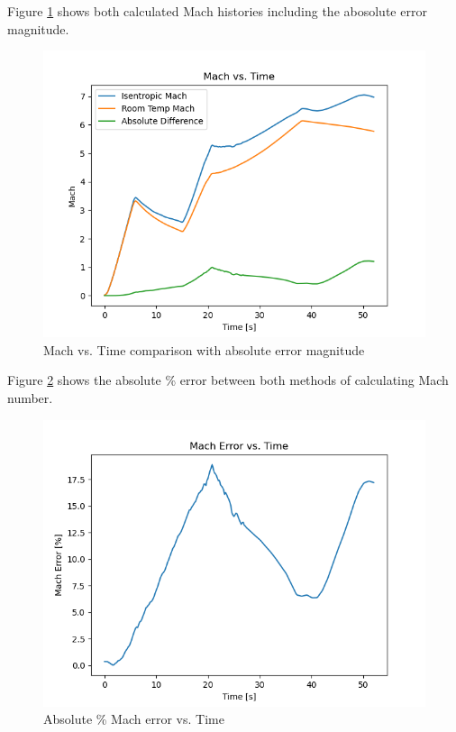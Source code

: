 \documentclass[../main.tex]{subfiles}
\begin{document}
Figure \ref{Mach} shows both calculated Mach histories including the abosolute error magnitude.

\begin{figure}[h]
    \centering
    \includegraphics[scale=.7]{../../images/problem_1/Mach_vs_Time.png}
    \caption{Mach vs. Time comparison with absolute error magnitude}
    \label{Mach}
\end{figure}

Figure \ref{Mach_error} shows the absolute \% error between both methods of calculating Mach number.

\begin{figure}[h]
    \centering
    \includegraphics[scale=.7]{../../images/problem_1/Mach_Error_vs_Time.png}
    \caption{Absolute \% Mach error vs. Time}
    \label{Mach_error}
\end{figure}
\end{document}

